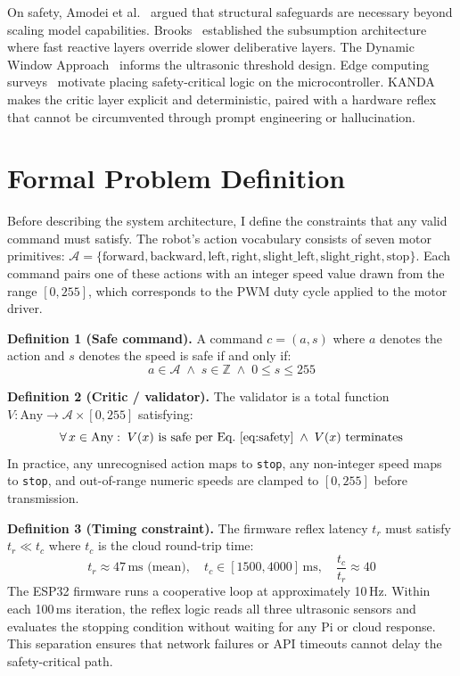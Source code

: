 \documentclass[conference]{IEEEtran}
\newcommand{\safe}{\texttt{stop}}
\begin{document}
On safety, Amodei et al.~\cite{amodei2016safety} argued that structural safeguards are necessary beyond scaling model capabilities. Brooks~\cite{brooks1986robust} established the subsumption architecture where fast reactive layers override slower deliberative layers. The Dynamic Window Approach~\cite{fox1997dwa} informs the ultrasonic threshold design. Edge computing surveys~\cite{bonomi2012fog,shi2016edge} motivate placing safety-critical logic on the microcontroller. KANDA makes the critic layer explicit and deterministic, paired with a hardware reflex that cannot be circumvented through prompt engineering or hallucination.

\section{Formal Problem Definition}
\label{sec:formal}

Before describing the system architecture, I define the constraints that any valid command must satisfy. The robot's action vocabulary consists of seven motor primitives: $\mathcal{A} = \{\text{forward}, \text{backward}, \text{left}, \text{right}, \text{slight\_left}, \text{slight\_right}, \text{stop}\}$. Each command pairs one of these actions with an integer speed value drawn from the range $[0, 255]$, which corresponds to the PWM duty cycle applied to the motor driver.

\textbf{Definition 1 (Safe command).}
A command $c = (a, s)$ where $a$ denotes the action and $s$ denotes the speed is safe if and only if:
\begin{equation}
\label{eq:safety}
a \in \mathcal{A} \;\wedge\; s \in \mathbb{Z} \;\wedge\; 0 \leq s \leq 255
\end{equation}

\textbf{Definition 2 (Critic / validator).}
The validator is a total function $V:\text{Any} \to \mathcal{A} \times [0,255]$ satisfying:
\begin{equation}
\label{eq:validator}
\forall\, x \in \text{Any}:\; V(x) \text{ is safe per Eq.~\eqref{eq:safety}} \;\wedge\; V(x) \text{ terminates}
\end{equation}
In practice, any unrecognised action maps to \safe{}, any non-integer speed maps to \safe{}, and out-of-range numeric speeds are clamped to $[0, 255]$ before transmission.

\textbf{Definition 3 (Timing constraint).}
The firmware reflex latency $t_r$ must satisfy $t_r \ll t_c$ where $t_c$ is the cloud round-trip time:
\begin{equation}
\label{eq:timing}
t_r \approx 47\,\text{ms (mean)}, \quad
t_c \in [1500, 4000]\,\text{ms}, \quad
\frac{t_c}{t_r} \approx 40
\end{equation}
The ESP32 firmware runs a cooperative loop at approximately 10\,Hz. Within each 100\,ms iteration, the reflex logic reads all three ultrasonic sensors and evaluates the stopping condition without waiting for any Pi or cloud response. This separation ensures that network failures or API timeouts cannot delay the safety-critical path.
\end{document}
